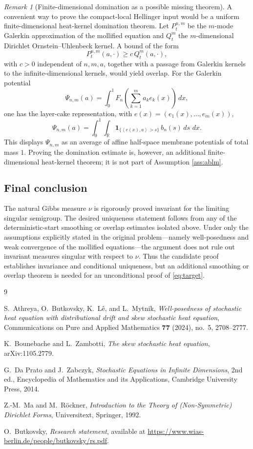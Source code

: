 \documentclass[12pt]{article}
\newcommand{\R}{\mathbb R}
\newcommand{\1}{\mathbf 1}
\newcommand{\dd}{\,d}
\newcommand{\ip}[2]{\left\langle #1,#2\right\rangle}
\theoremstyle{plain}
\theoremstyle{definition}
\theoremstyle{remark}
\newtheorem{remark}[theorem]{Remark}
\numberwithin{equation}{section}
\begin{document}
\begin{remark}[Finite-dimensional domination as a possible missing theorem]
A convenient way to prove the compact-local Hellinger input would be a uniform
finite-dimensional heat-kernel domination theorem.  Let \(P_t^{n,m}\) be the
\(m\)-mode Galerkin approximation of the mollified equation and \(Q_t^m\) the
\(m\)-dimensional Dirichlet Ornstein--Uhlenbeck kernel.  A bound of the form
\[
P_t^{n,m}(a,\cdot)\ge c\,Q_t^m(a,\cdot),
\]
with \(c>0\) independent of \(n,m,a\), together with a passage from Galerkin
kernels to the infinite-dimensional kernels, would yield overlap.  For the
Galerkin potential
\[
\Psi_{n,m}(a)
=
\int_0^1F_n\!\left(\sum_{k=1}^ma_ke_k(x)\right)\dd x,
\]
one has the layer-cake representation, with
\(e(x)=(e_1(x),\ldots,e_m(x))\),
\[
\Psi_{n,m}(a)
=
\int_0^1\int_{\R}
\1_{\{\ip{e(x)}{a}>s\}}\,b_n(s)\dd s\,\dd x.
\]
This displays \(\Psi_{n,m}\) as an average of affine half-space membrane
potentials of total mass \(1\).  Proving the domination estimate is, however,
an additional finite-dimensional heat-kernel theorem; it is not part of
Assumption \ref{ass:ablm}.
\end{remark}

\subsection*{Final conclusion}

The natural Gibbs measure \(\nu\) is rigorously proved invariant for the
limiting singular semigroup.  The desired uniqueness statement follows from
any of the deterministic-start smoothing or overlap estimates isolated above.
Under only the assumptions explicitly stated in the original problem---namely
well-posedness and weak convergence of the mollified equations---the argument
does not rule out invariant measures singular with respect to \(\nu\).  Thus the
candidate proof establishes invariance and conditional uniqueness, but an
additional smoothing or overlap theorem is needed for an unconditional proof of
\eqref{eq:target}.

\begin{thebibliography}{9}

S.~Athreya, O.~Butkovsky, K.~L\^{e}, and L.~Mytnik,
\emph{Well-posedness of stochastic heat equation with distributional drift and
skew stochastic heat equation},
Communications on Pure and Applied Mathematics \textbf{77} (2024), no.~5,
2708--2777.

K.~Bounebache and L.~Zambotti,
\emph{The skew stochastic heat equation},
arXiv:1105.2779.

G.~Da Prato and J.~Zabczyk,
\emph{Stochastic Equations in Infinite Dimensions},
2nd ed., Encyclopedia of Mathematics and its Applications, Cambridge
University Press, 2014.

Z.-M.~Ma and M.~R{\"o}ckner,
\emph{Introduction to the Theory of (Non-Symmetric) Dirichlet Forms},
Universitext, Springer, 1992.

O.~Butkovsky,
\emph{Research statement},
available at \url{https://www.wias-berlin.de/people/butkovsky/rs.pdf}.

\end{thebibliography}
\end{document}
